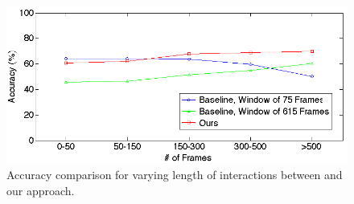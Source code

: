 \documentclass[10pt,twocolumn,letterpaper]{article}
\begin{document}
\begin{figure}[h]
\begin{center}
\includegraphics[scale=0.25]{frame_no.png}
\end{center}
\caption{Accuracy comparison for varying length of interactions between \cite{CRIM13} and our approach.}
\label{frame_no}
\end{figure}



{\footnotesize

}
\end{document}
